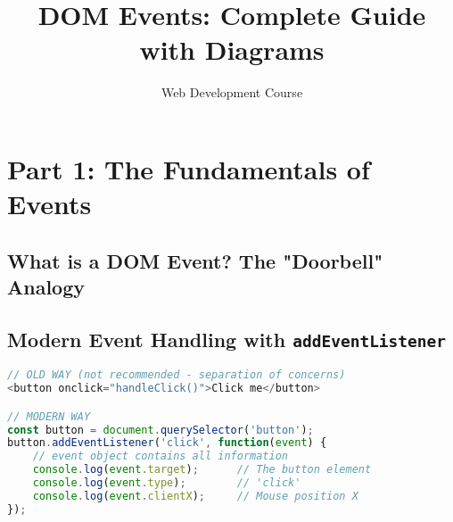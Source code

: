 \documentclass{article.cls}
\begin{document}
    \title{DOM Events: Complete Guide with Diagrams}
    \author{Web Development Course}
    \date{}
    \maketitle

    \section*{Part 1: The Fundamentals of Events}

    \subsection*{What is a DOM Event? The "Doorbell" Analogy}


    \subsection*{Modern Event Handling with \texttt{addEventListener}}

    \begin{lstlisting}[language=JavaScript, caption=Modern Event Handling]
// OLD WAY (not recommended - separation of concerns)
<button onclick="handleClick()">Click me</button>

// MODERN WAY
const button = document.querySelector('button');
button.addEventListener('click', function(event) {
    // event object contains all information
    console.log(event.target);      // The button element
    console.log(event.type);        // 'click'
    console.log(event.clientX);     // Mouse position X
});
    \end{lstlisting}
\end{document}
